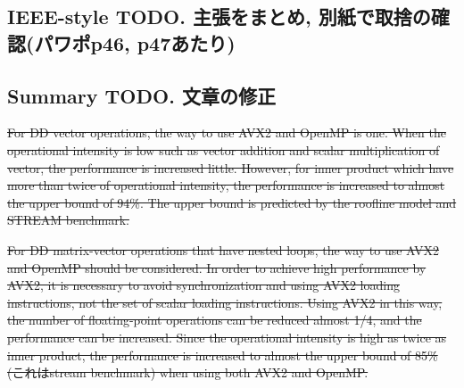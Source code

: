 \documentclass{IOS-Book-Article}
\begin{document}
\subsection{IEEE-style TODO. 主張をまとめ, 別紙で取捨の確認(パワポp46, p47あたり)}

\subsection{Summary TODO. 文章の修正}
\sout{For DD vector operations, the way to use AVX2 and OpenMP is one. When the operational intensity is low  such as vector addition and scalar multiplication of vector, the performance is increased little. However, for inner product which have more than twice of operational intensity, the performance is increased to almost the upper bound of 94\%. The upper bound is predicted by the roofline model and STREAM benchmark.}

{\color{magenta}{Before offloading to outer C function, it is required to allocate memory address in MATLAB. 
This overhead degrades some vector operations such as vector addition, scalar multiplication of vector, and axpy, which require output of vector. 
This overhead cannot consider in the roof line model, so the performance levels are low. 
Since the inner product is not require output of vector, its performance level is high when using the roof line model. 
However, the performances for vector operations are low or modest, because their operational intensities are low, and being bounded on memory references.}}

\sout{For DD matrix-vector operations that have nested loops, the way to use AVX2 and OpenMP should be considered. In order to achieve high performance by AVX2, it is necessary to avoid synchronization and using AVX2 loading instructions, not the set of scalar loading instructions. Using AVX2 in this way, the number of floating-point operations can be reduced almost 1/4, and the performance can be increased. Since the operational intensity is high as twice as inner product, the performance is increased to almost the upper bound of 85\% (これはstream benchmark) when using both AVX2 and OpenMP. }

{\color{magenta}{As for DD matrix-vector operations, it is necessary for achieving high performance to use AVX2 loading / storing instructions instead of the set of scalar instructions. 
Using AVX2 in this way, and using OpenMP to the outer loop, the performance can become the 66\% of the upper bound of performance.}}
\end{document}
